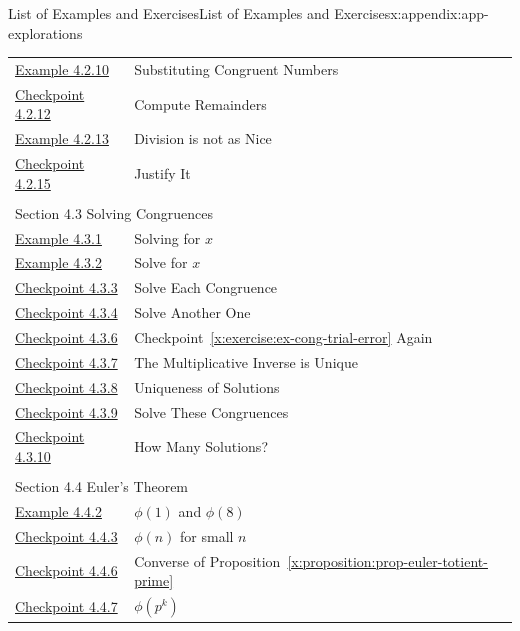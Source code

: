 \documentclass[oneside,10pt,]{book}
\newcommand{\xreffont}{\relax}
\numberwithin{equation}{section}
\begin{document}
\begin{appendixptx}{List of Examples and Exercises}{}{List of Examples and Exercises}{}{}{x:appendix:app-explorations}
\begin{longtable}[l]{ll}
\hyperref[x:example:eg-cong-modular-arithmetic]{Example 4.2.10}& Substituting Congruent Numbers\\
\hyperref[x:exercise:ex-cong-compute-remainder]{Checkpoint 4.2.12}& Compute Remainders\\
\hyperref[x:example:eg-cong-dividing-doesnt-work]{Example 4.2.13}& Division is not as Nice\\
\hyperref[x:exercise:ex-cong-division-explain]{Checkpoint 4.2.15}& Justify It\\
\multicolumn{2}{l}{\null}\\[1.5ex] \multicolumn{2}{l}{\large Section 4.3 Solving Congruences}\\[0.5ex]
\hyperref[x:example:eg-cong-solve-congruence]{Example 4.3.1}& Solving for \(x\)\\
\hyperref[x:example:eg-cong-solve-congruence-express]{Example 4.3.2}& Solve for \(x\)\\
\hyperref[x:exercise:ex-cong-solve-for-x]{Checkpoint 4.3.3}& Solve Each Congruence\\
\hyperref[x:exercise:ex-cong-trial-error]{Checkpoint 4.3.4}& Solve Another One\\
\hyperref[x:exercise:ex-cong-multiplicative-inverse]{Checkpoint 4.3.6}& Checkpoint~{\xreffont\ref*{x:exercise:ex-cong-trial-error}} Again\\
\hyperref[x:exercise:ex-cong-prove-inverse-unique]{Checkpoint 4.3.7}& The Multiplicative Inverse is Unique\\
\hyperref[x:exercise:ex-cong-rel-prime-unique]{Checkpoint 4.3.8}& Uniqueness of Solutions\\
\hyperref[x:exercise:ex-cong-solve-congruences]{Checkpoint 4.3.9}& Solve These Congruences\\
\hyperref[x:exercise:ex-cong-how-many-solutions]{Checkpoint 4.3.10}& How Many Solutions?\\
\multicolumn{2}{l}{\null}\\[1.5ex] \multicolumn{2}{l}{\large Section 4.4 Euler's Theorem}\\[0.5ex]
\hyperref[x:example:eg-cong-totient]{Example 4.4.2}& \(\phi(1)\) and \(\phi(8)\)\\
\hyperref[x:exercise:ex-cong-totient]{Checkpoint 4.4.3}& \(\phi(n)\) for small \(n\)\\
\hyperref[x:exercise:ex-cong-euler-totient-prime-converse]{Checkpoint 4.4.6}& Converse of Proposition~{\xreffont\ref*{x:proposition:prop-euler-totient-prime}}\\
\hyperref[x:exercise:ex-cong-euler-totient-prime-power]{Checkpoint 4.4.7}& \(\phi(p^k)\)\\

\end{longtable}
\end{appendixptx}
\end{document}
